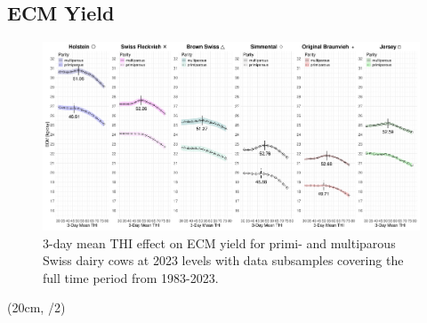     
\newpage

\newpage
\begin{landscape}
    \thispagestyle{empty}
    \section{ECM Yield}\label{sec:ecm_yield}
    \begin{figure}[ht]
        \centering
        \includegraphics[width=0.85\paperheight]{thesis/figures/results/ecm_yield.png}
        \caption{3-day mean THI effect on ECM yield for primi- and multiparous Swiss dairy cows at 2023 levels with data subsamples covering the full time period from 1983-2023.}
        \label{fig:results_ecm_yield}
    \end{figure}
    
    \begin{textblock*}{2cm}(20cm, \dimexpr\paperheight/2)
    \end{textblock*}
\end{landscape}
\newpage


